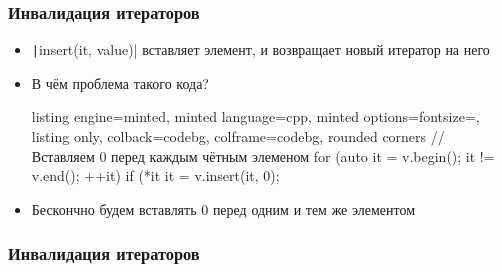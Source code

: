 \documentclass[10pt]{beamer}
\begin{document}
\begin{frame}[fragile]
\frametitle{Инвалидация итераторов}
\begin{itemize}
\item \texttt|insert(it, value)| вставляет элемент, и возвращает новый итератор на него
\pause
\item В чём проблема такого кода?
\begin{tcblisting}{listing engine=minted, minted language=cpp, minted options={fontsize=\scriptsize}, listing only, colback=codebg, colframe=codebg, rounded corners}
// Вставляем 0 перед каждым чётным элеменом
for (auto it = v.begin(); it != v.end(); ++it)
  if (*it %
    it = v.insert(it, 0);
\end{tcblisting}
\pause
{}
\item Бескончно будем вставлять 0 перед одним и тем же элементом
\end{itemize}
\end{frame}

\begin{frame}[fragile]
\frametitle{Инвалидация итераторов}
\begin{itemize}
\end{itemize}
\end{frame}
\end{document}
